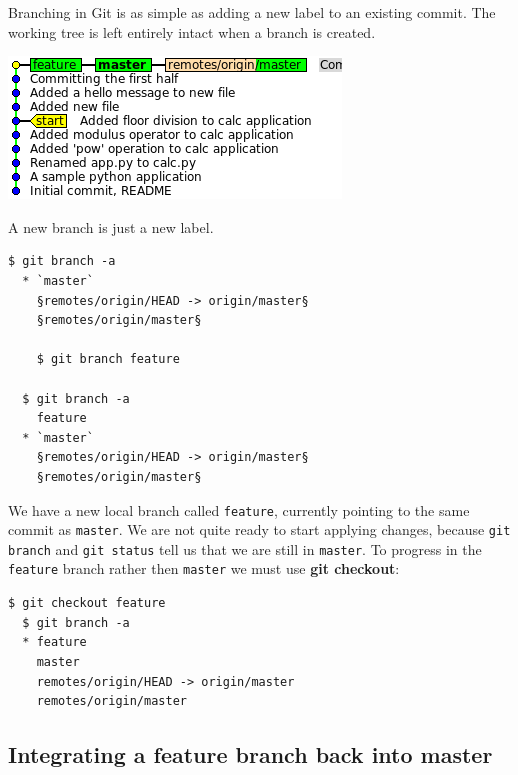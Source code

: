 \documentclass[a4paper]{../../common/tufte-latex/tufte-handout}
\begin{document}
Branching in Git is as simple as adding a new label to an existing commit.
The working tree is left entirely intact when a branch is created.
\begin{marginfigure}%
  \centering
  \includegraphics[width=\linewidth]{gitbranch-feature.png}
  \label{fig:gitbranch-feature}
  \caption{A new branch is just a new label.}
\end{marginfigure}
\begin{lstlisting}[style=BashInputStyle]
  $ git branch -a
  * `master`
    §remotes/origin/HEAD -> origin/master§
    §remotes/origin/master§

    $ git branch feature

  $ git branch -a
    feature
  * `master`
    §remotes/origin/HEAD -> origin/master§
    §remotes/origin/master§
\end{lstlisting}

We have a new local branch called \texttt{feature}, currently pointing to the same commit as \texttt{master}.
We are not quite ready to start applying changes, because \texttt{git branch} and \texttt{git status} tell us that we are still in \texttt{master}.
To progress in the \texttt{feature} branch rather then \texttt{master} we must use \textbf{git checkout}:

\begin{lstlisting}[style=BashInputStyle]
  $ git checkout feature
  $ git branch -a
  * feature
    master
    remotes/origin/HEAD -> origin/master
    remotes/origin/master
\end{lstlisting}

\subsection{Integrating a feature branch back into master}
\end{document}
